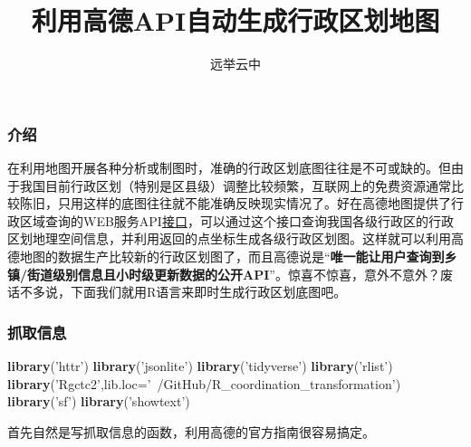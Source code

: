 \documentclass[]{article}
\title{利用高德API自动生成行政区划地图}
\author{远举云中}
\date{}
\newenvironment{Shaded}{\begin{snugshade}}{\end{snugshade}}
\newcommand{\DataTypeTok}[1]{\textcolor[rgb]{0.13,0.29,0.53}{#1}}
\newcommand{\KeywordTok}[1]{\textcolor[rgb]{0.13,0.29,0.53}{\textbf{#1}}}
\newcommand{\NormalTok}[1]{#1}
\newcommand{\StringTok}[1]{\textcolor[rgb]{0.31,0.60,0.02}{#1}}
\begin{document}
\maketitle

\subsubsection{介绍}

在利用地图开展各种分析或制图时，准确的行政区划底图往往是不可或缺的。但由于我国目前行政区划（特别是区县级）调整比较频繁，互联网上的免费资源通常比较陈旧，只用这样的底图往往就不能准确反映现实情况了。好在高德地图提供了行政区域查询的WEB服务API\href{http://lbs.amap.com/api/webservice/guide/api/district/}{接口}，可以通过这个接口查询我国各级行政区的行政区划地理空间信息，并利用返回的点坐标生成各级行政区划图。这样就可以利用高德地图的数据生产比较新的行政区划图了，而且高德说是``\textbf{唯一能让用户查询到乡镇/街道级别信息且小时级更新数据的公开API}''。惊喜不惊喜，意外不意外？废话不多说，下面我们就用R语言来即时生成行政区划底图吧。

\subsubsection{抓取信息}

\begin{Shaded}
\begin{Highlighting}[]
\KeywordTok{library}\NormalTok{(}\StringTok{'httr'}\NormalTok{)}
\KeywordTok{library}\NormalTok{(}\StringTok{'jsonlite'}\NormalTok{)}
\KeywordTok{library}\NormalTok{(}\StringTok{'tidyverse'}\NormalTok{)}
\KeywordTok{library}\NormalTok{(}\StringTok{'rlist'}\NormalTok{)}
\KeywordTok{library}\NormalTok{(}\StringTok{'Rgctc2'}\NormalTok{,}\DataTypeTok{lib.loc=}\StringTok{'~/GitHub/R_coordination_transformation'}\NormalTok{)}
\KeywordTok{library}\NormalTok{(}\StringTok{'sf'}\NormalTok{)}
\KeywordTok{library}\NormalTok{(}\StringTok{'showtext'}\NormalTok{)}
\end{Highlighting}
\end{Shaded}

首先自然是写抓取信息的函数，利用高德的官方指南很容易搞定。
\end{document}
